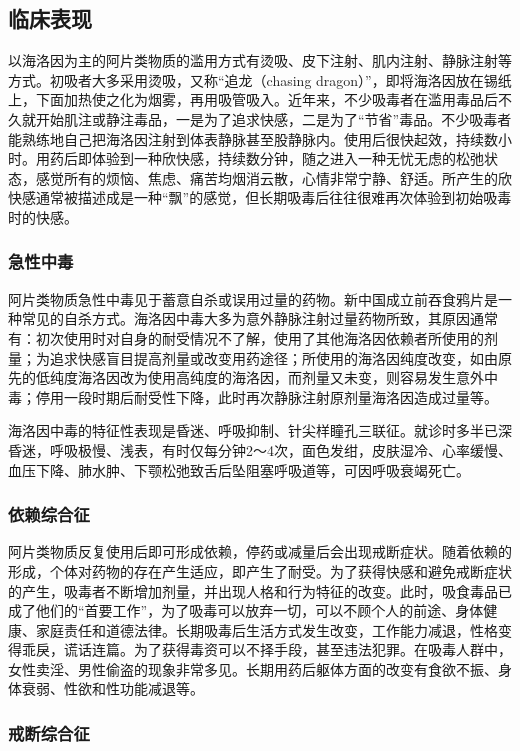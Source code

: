 \subsection{临床表现}

以海洛因为主的阿片类物质的滥用方式有烫吸、皮下注射、肌内注射、静脉注射等方式。初吸者大多采用烫吸，又称“追龙（chasing
dragon）”，即将海洛因放在锡纸上，下面加热使之化为烟雾，再用吸管吸入。近年来，不少吸毒者在滥用毒品后不久就开始肌注或静注毒品，一是为了追求快感，二是为了“节省”毒品。不少吸毒者能熟练地自己把海洛因注射到体表静脉甚至股静脉内。使用后很快起效，持续数小时。用药后即体验到一种欣快感，持续数分钟，随之进入一种无忧无虑的松弛状态，感觉所有的烦恼、焦虑、痛苦均烟消云散，心情非常宁静、舒适。所产生的欣快感通常被描述成是一种“飘”的感觉，但长期吸毒后往往很难再次体验到初始吸毒时的快感。

\subsubsection{急性中毒}

阿片类物质急性中毒见于蓄意自杀或误用过量的药物。新中国成立前吞食鸦片是一种常见的自杀方式。海洛因中毒大多为意外静脉注射过量药物所致，其原因通常有：初次使用时对自身的耐受情况不了解，使用了其他海洛因依赖者所使用的剂量；为追求快感盲目提高剂量或改变用药途径；所使用的海洛因纯度改变，如由原先的低纯度海洛因改为使用高纯度的海洛因，而剂量又未变，则容易发生意外中毒；停用一段时期后耐受性下降，此时再次静脉注射原剂量海洛因造成过量等。

海洛因中毒的特征性表现是昏迷、呼吸抑制、针尖样瞳孔三联征。就诊时多半已深昏迷，呼吸极慢、浅表，有时仅每分钟2～4次，面色发绀，皮肤湿冷、心率缓慢、血压下降、肺水肿、下颚松弛致舌后坠阻塞呼吸道等，可因呼吸衰竭死亡。

\subsubsection{依赖综合征}

阿片类物质反复使用后即可形成依赖，停药或减量后会出现戒断症状。随着依赖的形成，个体对药物的存在产生适应，即产生了耐受。为了获得快感和避免戒断症状的产生，吸毒者不断增加剂量，并出现人格和行为特征的改变。此时，吸食毒品已成了他们的“首要工作”，为了吸毒可以放弃一切，可以不顾个人的前途、身体健康、家庭责任和道德法律。长期吸毒后生活方式发生改变，工作能力减退，性格变得乖戾，谎话连篇。为了获得毒资可以不择手段，甚至违法犯罪。在吸毒人群中，女性卖淫、男性偷盗的现象非常多见。长期用药后躯体方面的改变有食欲不振、身体衰弱、性欲和性功能减退等。

\subsubsection{戒断综合征}

